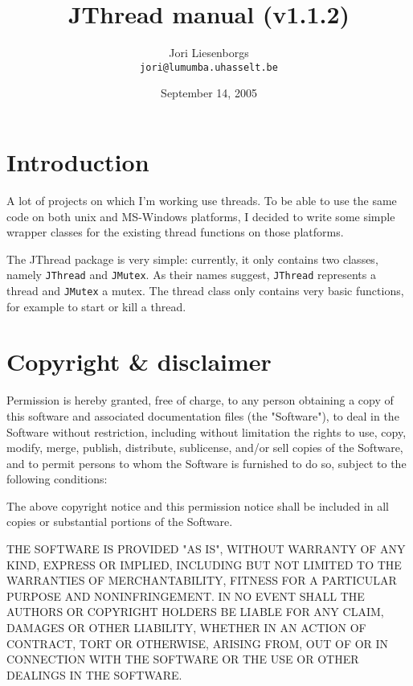 \documentclass[a4paper,12pt]{article}
\begin{document}
	\title{JThread manual (v1.1.2)}
	\author{Jori Liesenborgs\\
	        {\tt jori@lumumba.uhasselt.be} }
	\date{September 14, 2005}
	\maketitle

	\section{Introduction}

	A lot of projects on which I'm working use threads. To be able to
	use the same code on both unix and MS-Windows platforms, I decided
	to write some simple wrapper classes for the existing thread functions
	on those platforms.

	The JThread package is very simple: currently, it only contains two
	classes, namely {\tt JThread} and {\tt JMutex}. As their names 
	suggest, {\tt JThread} represents a thread and {\tt JMutex} a mutex.
	The thread class only contains very basic functions, for example to
	start or kill a thread.

	\section{Copyright \& disclaimer}

	Permission is hereby granted, free of charge, to any person obtaining a
	copy of this software and associated documentation files (the "Software"),
	to deal in the Software without restriction, including without limitation
	the rights to use, copy, modify, merge, publish, distribute, sublicense,
	and/or sell copies of the Software, and to permit persons to whom the
	Software is furnished to do so, subject to the following conditions:

	The above copyright notice and this permission notice shall be included
	in all copies or substantial portions of the Software.

	THE SOFTWARE IS PROVIDED "AS IS", WITHOUT WARRANTY OF ANY KIND, EXPRESS
	OR IMPLIED, INCLUDING BUT NOT LIMITED TO THE WARRANTIES OF MERCHANTABILITY,
	FITNESS FOR A PARTICULAR PURPOSE AND NONINFRINGEMENT.  IN NO EVENT SHALL
	THE AUTHORS OR COPYRIGHT HOLDERS BE LIABLE FOR ANY CLAIM, DAMAGES OR OTHER
	LIABILITY, WHETHER IN AN ACTION OF CONTRACT, TORT OR OTHERWISE, ARISING
	FROM, OUT OF OR IN CONNECTION WITH THE SOFTWARE OR THE USE OR OTHER DEALINGS
	IN THE SOFTWARE.
\end{document}
